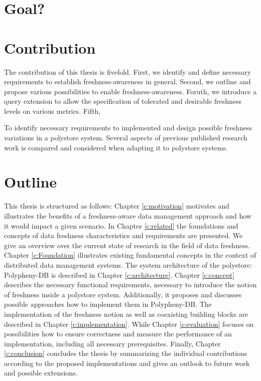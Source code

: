 
\section{Goal?}



\section{Contribution}
The contribution of this thesis is fivefold. First, we identify and define necessary requirements to establish freshness-awareness in general.
Second, we outline and propose various possibilities to enable freshness-awareness. Foruth, we introduce a query extension to allow the specification
of tolerated and desirable freshness levels on various metrics. Fifth, 

To identify necessary requirements to implemented and design possible 
freshness variations in a polystore system. Several aspects of previous published research work is compared and considered when adapting it to polystore systems.



\section{Outline}
This thesis is structured as follows:
Chapter \ref{c:motivation} motivates and illustrates the benefits of a freshness-aware data management approach and how it would impact a given scenario.
In Chapter \ref{c:related} the foundations and concepts of data freshness characteristics and requirements are presented.
We give an overview over the current state of research in the field of data freshness. 
Chapter \ref{c:Foundation} illustrates existing fundamental concepts in the context of distributed data management systems. 
The system architecture of the polystore: Polypheny-DB is described in Chapter \ref{c:architecture}.
Chapter \ref{c:concept} describes the necessary functional requirements, necessary to introduce the notion of freshness inside a polystore system. Additionally, 
it proposes and discusses possible approaches how to implement them in Polypheny-DB. 
The implementation of the freshness notion as well as coexisting building blocks are described in Chapter \ref{c:implementation}.
While Chapter \ref{c:evaluation} focuses on possibilities how to ensure correctness and measure the performance of an implementation, including all necessary prerequisites.
Finally, Chapter \ref{c:conclusion} concludes the thesis by summarizing the individual contributions according to the proposed
implementations and gives an outlook to future work and possible extensions.


